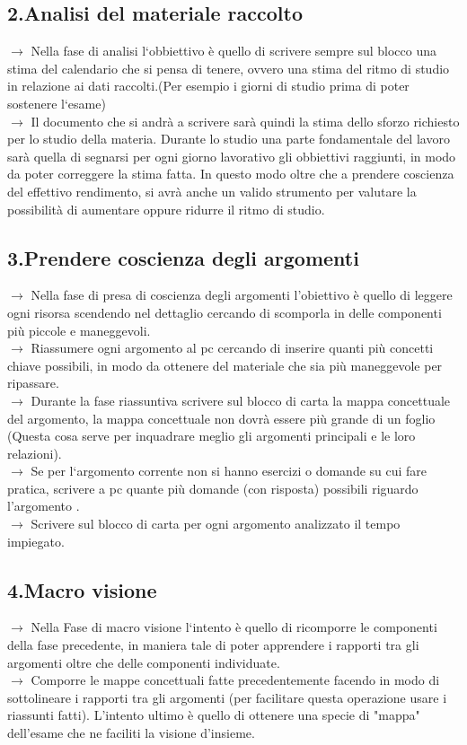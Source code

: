 \documentclass[11pt,a4paper]{article}
\begin{document}
\subsection{2.Analisi del materiale raccolto}
$\rightarrow$ Nella fase di analisi l`obbiettivo è quello di scrivere sempre sul blocco una stima del calendario che si pensa di tenere, ovvero una stima del ritmo di studio in relazione ai dati raccolti.(Per esempio i giorni di studio prima di poter sostenere l`esame)\\
$\rightarrow$ Il documento che si andrà a scrivere sarà quindi la stima dello sforzo richiesto per lo studio della materia.
 Durante lo studio una parte fondamentale del lavoro sarà quella di segnarsi per ogni giorno lavorativo gli obbiettivi raggiunti, in modo da poter correggere la stima fatta. In questo modo oltre che a prendere coscienza del effettivo rendimento, si avrà anche un valido strumento per valutare la possibilità di aumentare oppure ridurre il ritmo di studio.\\

\subsection{3.Prendere coscienza degli argomenti}
$\rightarrow$ Nella fase di presa di coscienza degli argomenti l'obiettivo è quello di leggere ogni risorsa scendendo nel dettaglio cercando di scomporla in delle componenti più piccole e maneggevoli.\\
$\rightarrow$ Riassumere ogni argomento al pc cercando di inserire quanti più concetti chiave possibili, in modo da ottenere del materiale che sia più maneggevole per ripassare.\\
$\rightarrow$ Durante la fase riassuntiva scrivere sul blocco di carta la mappa concettuale del argomento, la mappa concettuale non dovrà essere più grande di un foglio (Questa cosa serve per inquadrare meglio gli argomenti principali e le loro relazioni).\\
$\rightarrow$ Se per l`argomento corrente non si hanno esercizi o domande su cui fare pratica, scrivere a pc quante più domande (con risposta) possibili riguardo l'argomento .\\
$\rightarrow$ Scrivere sul blocco di carta per ogni argomento analizzato il tempo impiegato.\\

\subsection{4.Macro visione}
$\rightarrow$ Nella Fase di macro visione l`intento è quello di ricomporre le componenti della fase precedente, in maniera tale di poter apprendere i rapporti tra gli argomenti oltre che delle componenti individuate.\\
$\rightarrow$ Comporre le mappe concettuali fatte precedentemente facendo in modo di sottolineare i rapporti tra gli argomenti (per facilitare questa operazione usare i riassunti fatti). L'intento ultimo è quello di ottenere una specie di "mappa" dell'esame che ne faciliti la visione d'insieme. \\
\end{document}
